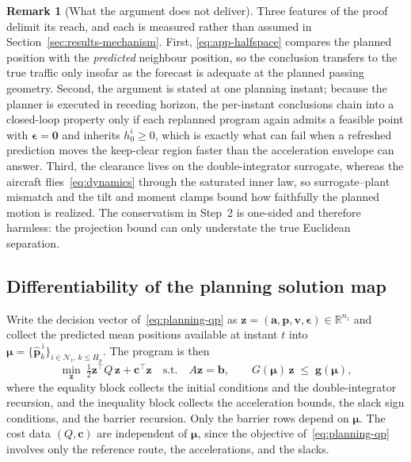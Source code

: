\documentclass[11pt]{article}
\theoremstyle{plain}
\theoremstyle{definition}
\newtheorem{remark}{Remark}
\newcommand{\R}{\mathbb{R}}
\begin{document}
\begin{remark}[What the argument does not deliver]
	\label{rem:invariance-scope}
	Three features of the proof delimit its reach, and each is measured
	rather than assumed in Section~\ref{sec:results-mechanism}.
	First, \eqref{eq:app-halfspace} compares the planned position with
	the \emph{predicted} neighbour position, so the conclusion transfers
	to the true traffic only insofar as the forecast is adequate at the
	planned passing geometry. Second, the argument is stated at one
	planning instant; because the planner is executed in receding
	horizon, the per-instant conclusions chain into a closed-loop
	property only if each replanned program again admits a feasible
	point with $\bm{\epsilon}=\bm{0}$ and inherits $h^i_0\geq0$, which
	is exactly what can fail when a refreshed prediction moves the
	keep-clear region faster than the acceleration envelope can answer.
	Third, the clearance lives on the double-integrator surrogate,
	whereas the aircraft flies~\eqref{eq:dynamics} through the saturated
	inner law, so surrogate--plant mismatch and the tilt and moment
	clamps bound how faithfully the planned motion is realized. The
	conservatism in Step~2 is one-sided and therefore harmless: the
	projection bound can only understate the true Euclidean separation.
\end{remark}

\subsection{Differentiability of the planning solution map}
\label{app:gradient}

Write the decision vector of~\eqref{eq:planning-qp} as
$\bm{z}=(\bm{a},\bm{p},\bm{v},\bm{\epsilon})\in\R^{n_z}$ and collect
the predicted mean positions available at instant $t$ into
$\bm{\mu}=\{\hat{\bm{p}}^{\,i}_{k}\}_{i\in\mathcal{N}_t,\,k\leq H_p}$.
The program is then
\begin{equation}
	\label{eq:app-qp}
	\min_{\bm{z}}\ \tfrac12\bm{z}^{\top}\!Q\,\bm{z}+\bm{c}^{\top}\bm{z}
	\quad\text{s.t.}\quad
	A\bm{z}=\bm{b},\qquad
	G(\bm{\mu})\,\bm{z}\;\leq\;\bm{g}(\bm{\mu}),
\end{equation}
where the equality block collects the initial conditions and the
double-integrator recursion, and the inequality block collects the
acceleration bounds, the slack sign conditions, and the barrier
recursion. Only the barrier rows depend on $\bm{\mu}$. The cost data
$(Q,\bm{c})$ are independent of $\bm{\mu}$, since the objective
of~\eqref{eq:planning-qp} involves only the reference route, the
accelerations, and the slacks.
\end{document}
